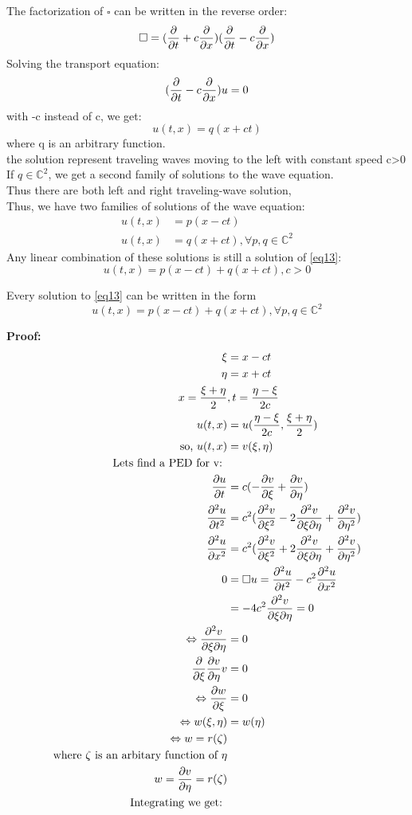 The factorization of $ \square $ can be written in the reverse order:
$$
    \square=(\pdv{}{t}+c\pdv{}{x})(\pdv{}{t}-c\pdv{}{x})
$$
Solving the transport equation:
$$
    (\pdv{}{t}-c\pdv{}{x})u=0
$$
with -c instead of c, we get:
$$
    u(t,x)=q(x+ct)
$$ 
where q is an arbitrary function.\\
the solution represent traveling waves moving to the left with constant speed c>0\\
If $ q\in \mathbb{C}^2$, we get a second family of solutions to the wave equation.\\
Thus there are both left and right traveling-wave solution,\\
Thus, we have two families of solutions of the wave equation:
\begin{align*}{}{}
u(t,x)&=p(x-ct)\\
u(t,x)&=q(x+ct), \forall p,q\in \mathbb{C}^2
\end{align*}
Any linear combination of these solutions is still a solution of \eqref{eq13}:
$$
    u(t,x)=p(x-ct)+q(x+ct),c>0
$$ 
\begin{theorem}[]{}
Every solution to \eqref{eq13} can be written in the form \begin{equation}
    \label{eq16} u(t,x)=p(x-ct)+q(x+ct), \forall p,q\in \mathbb{C}^2
\end{equation}
\end{theorem}
\textbf{Proof:}
\begin{align*}{}{}
    \xi &=x-ct\\
    \eta&=x+ct\\
    x=\frac{\xi+\eta}{2}&,t=\frac{\eta-\xi}{2c}\\
    u(t,x)&=u(\frac{\eta-\xi}{2c},\frac{\xi+\eta}{2})\\
    \text{so, }u(t,x)&=v(\xi,\eta)\\
    \text{Lets find a PED for v: }\\
    \pdv{u}{t}&=c(-\pdv{v}{\xi}+\pdv{v}{\eta})\\
    \pdv[2]{u}{t}&=c^2(\pdv[2]{v}{\xi}-2\pdv{v}{\xi}{\eta}+\pdv[2]{v}{\eta})\\
    \pdv[2]{u}{x}&=c^2(\pdv[2]{v}{\xi}+2\pdv{v}{\xi}{\eta}+\pdv[2]{v}{\eta})\\
    0&=\square u=\pdv[2]{u}{t}-c^2\pdv[2]{u}{x}\\
    &=-4c^2\pdv{v}{\xi}{\eta}=0\\
    \Leftrightarrow \pdv{v}{\xi}{\eta}&=0\\
    \frac{\partial}{\partial \xi}\frac{\partial v}{\partial \eta}v&=0\\
    \Leftrightarrow \frac{\partial w}{\partial \xi}&=0\\
    \Leftrightarrow w(\xi,\eta)&=w(\eta)\\
    \Leftrightarrow w=r(\zeta )\\
    \text{where } \zeta \text{ is an arbitary function of }\eta\\
    w=\pdv{v}{\eta}=r(\zeta )\\
    \text{Integrating we get: }\\
\end{align*}
